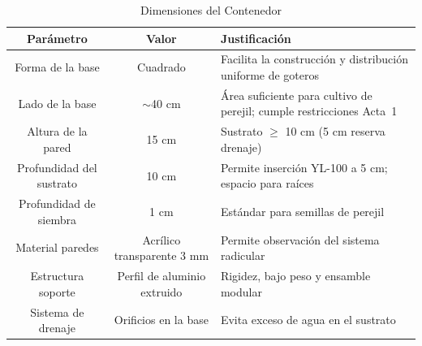 \begin{table}[tp]
\centering
\renewcommand{\arraystretch}{1.3}
\caption{Dimensiones del Contenedor}
\label{tab:dimensiones_contenedor}
\begin{tabularx}{\textwidth}{|c|c|X|}
\hline
\textbf{Parámetro} & \textbf{Valor} & \textbf{Justificación} \\
\hline
Forma de la base & Cuadrado & Facilita la construcción y distribución uniforme de goteros \\
\hline
Lado de la base & $\sim$40 cm & Área suficiente para cultivo de perejil; cumple restricciones Acta~1 \\
\hline
Altura de la pared & 15 cm & Sustrato $\geq$ 10 cm (5 cm reserva drenaje) \\
\hline
Profundidad del sustrato & 10 cm & Permite inserción YL-100 a 5 cm; espacio para raíces \\
\hline
Profundidad de siembra & 1 cm & Estándar para semillas de perejil \\
\hline
Material paredes & Acrílico transparente 3 mm & Permite observación del sistema radicular \\
\hline
Estructura soporte & Perfil de aluminio extruido & Rigidez, bajo peso y ensamble modular \\
\hline
Sistema de drenaje & Orificios en la base & Evita exceso de agua en el sustrato \\
\hline
\end{tabularx}
\end{table}